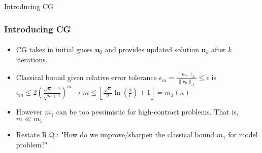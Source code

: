 \begin{frame}[label=intro_cg]{Introducing CG}
    \frametitle{Introducing CG}
    \framesubtitle{}
        \begin{itemize}
            \item<1-> CG takes in initial guess $\mathbf{u}_0$ and provides updated solution $\mathbf{u}_k$ after $k$ iterations.
            \item<2-> Classical bound given relative error tolerance $\epsilon_m = \frac{\|\mathbf{e}_m\|_A}{\|\mathbf{e}_0\|_A} \leq \epsilon$ is $\epsilon_m \leq 2\left(\frac{\sqrt{\kappa} - 1}{\sqrt{\kappa} + 1}\right)^{m} \longrightarrow m \leq \left\lfloor\frac{\sqrt{\kappa}}{2}\ln\left(\frac{2}{\epsilon}\right) + 1\right\rfloor = m_1(\kappa)$
            \item<3-> However $m_1$ can be too pessimistic for high-contrast problems. That is, $m \ll m_1$
            \item<4-> Restate R.Q.: "How do we improve/sharpen the classical bound $m_1$ for model problem?"
        \end{itemize}
\end{frame}